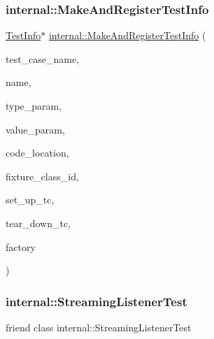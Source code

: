 \subsubsection{\texorpdfstring{internal\+::\+Make\+And\+Register\+Test\+Info}{internal::MakeAndRegisterTestInfo}}
{\footnotesize\ttfamily \hyperlink{classtesting_1_1TestInfo}{Test\+Info}$\ast$ \hyperlink{namespacetesting_1_1internal_a7f2e4e46c969fcae9d801d93a3e932fd}{internal\+::\+Make\+And\+Register\+Test\+Info} (\begin{DoxyParamCaption}\item[{const char $\ast$}]{test\+\_\+case\+\_\+name,  }\item[{const char $\ast$}]{name,  }\item[{const char $\ast$}]{type\+\_\+param,  }\item[{const char $\ast$}]{value\+\_\+param,  }\item[{\hyperlink{structtesting_1_1internal_1_1CodeLocation}{internal\+::\+Code\+Location}}]{code\+\_\+location,  }\item[{\hyperlink{namespacetesting_1_1internal_ab1114197d3c657d8b7f8e0c5caa12d00}{internal\+::\+Type\+Id}}]{fixture\+\_\+class\+\_\+id,  }\item[{\hyperlink{classtesting_1_1Test_a5f2a051d1d99c9b784c666c586186cf9}{Test\+::\+Set\+Up\+Test\+Case\+Func}}]{set\+\_\+up\+\_\+tc,  }\item[{\hyperlink{classtesting_1_1Test_aa0f532e93b9f3500144c53f31466976c}{Test\+::\+Tear\+Down\+Test\+Case\+Func}}]{tear\+\_\+down\+\_\+tc,  }\item[{\hyperlink{classtesting_1_1internal_1_1TestFactoryBase}{internal\+::\+Test\+Factory\+Base} $\ast$}]{factory }\end{DoxyParamCaption})\hspace{0.3cm}{\ttfamily [friend]}}

\mbox{\label{classtesting_1_1TestInfo_adc037d188dab349a94868991955c9cd4}} 
\subsubsection{\texorpdfstring{internal\+::\+Streaming\+Listener\+Test}{internal::StreamingListenerTest}}
{\footnotesize\ttfamily friend class internal\+::\+Streaming\+Listener\+Test\hspace{0.3cm}{\ttfamily [friend]}}



